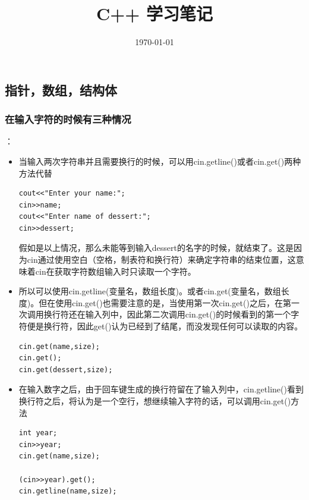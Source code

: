 \documentclass[a4paper,12pt]{article}
\begin{document}
\title{C++ 学习笔记}
\date{\today}
\maketitle
\begin{spacing}{2}
\tableofcontents
\newpage
{}
\end{spacing}
\begin{spacing}{2}
\section{指针，数组，结构体}
\subsubsection{在输入字符的时候有三种情况}：
\begin{itemize}
\item 当输入两次字符串并且需要换行的时候，可以用cin.getline()或者cin.get()两种方法代替
\begin{lstlisting}
cout<<"Enter your name:";
cin>>name;
cout<<"Enter name of dessert:";
cin>>dessert;
\end{lstlisting}
假如是以上情况，那么未能等到输入dessert的名字的时候，就结束了。这是因为cin通过使用空白（空格，制表符和换行符）来确定字符串的结束位置，这意
味着cin在获取字符数组输入时只读取一个字符。
\item 所以可以使用cin.getline(变量名，数组长度)。或者cin.get(变量名，数组长度)。但在使用cin.get()也需要注意的是，当使用第一次cin.get()之后，在第一次调用换行符还在输入列中，因此第二次调用cin.get()的时候看到的第一个字符便是换行符，因此get()认为已经到了结尾，而没发现任何可以读取的内容。
\begin{lstlisting}
cin.get(name,size);
cin.get();
cin.get(dessert,size);
\end{lstlisting}
\item 在输入数字之后，由于回车键生成的换行符留在了输入列中，cin.getline()看到换行符之后，将认为是一个空行，想继续输入字符的话，可以调用cin.get()方法
\begin{lstlisting}
int year;
cin>>year;
cin.get(name,size);

(cin>>year).get();
cin.getline(name,size);
\end{lstlisting}
\end{itemize}


\end{spacing}
\end{document}
